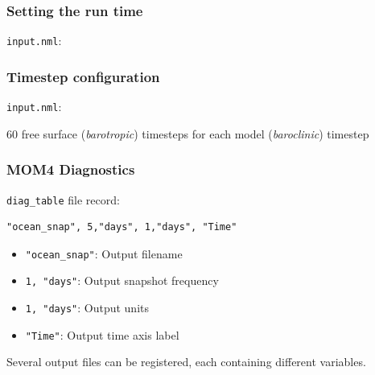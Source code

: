 \documentclass{beamer}
\begin{document}
\begin{frame}[fragile]
    \frametitle{Setting the run time}
   
    \lstinline|input.nml|:
    
\end{frame}

\begin{frame}[fragile]
    \frametitle{Timestep configuration}
   
    \lstinline|input.nml|:
    
    60 free surface (\textit{barotropic}) timesteps for each model
    (\textit{baroclinic}) timestep
\end{frame}

\begin{frame}[fragile]
    \frametitle{MOM4 Diagnostics}
    
    \lstinline|diag_table| file record:
    \begin{lstlisting}
"ocean_snap", 5,"days", 1,"days", "Time"
    \end{lstlisting}
    \begin{itemize}
        \item \lstinline|"ocean_snap"|: Output filename
        \item \lstinline|1, "days"|: Output snapshot frequency
        \item \lstinline|1, "days"|: Output units
        \item \lstinline|"Time"|: Output time axis label
    \end{itemize}
    Several output files can be registered, each containing different
    variables.
\end{frame}
\end{document}
